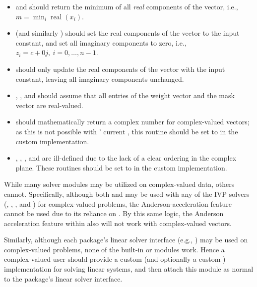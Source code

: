 \begin{itemize}
\item {} and  should return the minimum of
  all \emph{real} components of the vector, i.e.,  $m = \min_i
  \operatorname{real}(x_i) $.

\item {} (and similarly ) should
  set the real components of the vector to the input constant, and set
  all imaginary components to zero, i.e.,
  $z_i = c + 0 j,\: i=0,\ldots,n-1$.

\item {} should only update the real components of the
  vector with the input constant, leaving all imaginary components
  unchanged.

\item {}, , 
  and  should assume that all entries of the
  weight vector  and the mask vector  are real-valued.

\item {} should mathematically return a complex number
  for complex-valued vectors; as this is not possible with
  {\sundials}' current , this routine should
  be set to  in the custom {\nvector} implementation.

\item {}, , ,
   and 
  are ill-defined due to the lack of a clear ordering in the
  complex plane.  These routines should be set to 
  in the custom {\nvector} implementation.

\end{itemize}

While many {\sundials} solver modules may be utilized on
complex-valued data, others cannot.  Specifically, although both
{\sunnonlinsolnewton} and {\sunnonlinsolfixedpoint} may be used with
any of the IVP solvers ({\cvode}, {\cvodes}, {\ida}, {\idas} and
{\arkode}) for complex-valued problems, the Anderson-acceleration
feature {\sunnonlinsolfixedpoint} cannot be used due to its reliance
on .  By this same logic, the Anderson acceleration
feature within {\kinsol} also will not work with complex-valued
vectors.

Similarly, although each package's linear solver interface (e.g.,
{\cvls}) may be used on complex-valued problems, none of the built-in
{\sunmatrix} or {\sunlinsol} modules work.  Hence a complex-valued
user should provide a custom {\sunlinsol} (and optionally a custom
{\sunmatrix}) implementation for solving linear systems, and then
attach this module as normal to the package's linear solver
interface.

